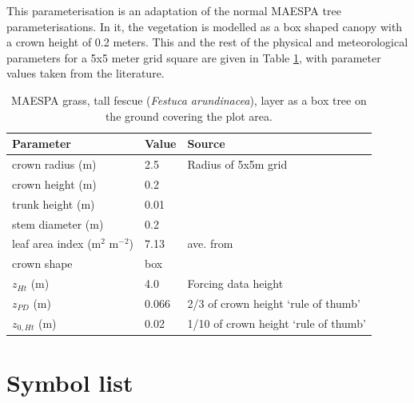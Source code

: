 \documentclass[preprint,12pt,authoryear]{elsarticle}
\begin{document}
This parameterisation is an adaptation of the normal MAESPA tree parameterisations. In it, the vegetation is modelled as a box shaped canopy with a crown height of 0.2 meters. This and the rest of the physical and meteorological parameters for a 5x5 meter grid square are given in Table \ref{tab:grassscaled}, with parameter values taken from the literature.

\begin{center}
\begin{table}[!htbp]
\caption{MAESPA grass, tall fescue (\textit{Festuca arundinacea}), layer as a box tree on the ground covering the plot area. \label{tab:grassscaled}}
\begin{tabular}{ |  l | l | l |}
\hline \textbf{Parameter} & \textbf{Value} & \textbf{Source} \\  \hline
crown radius (m) & 2.5& Radius of 5x5m grid \\ \hline
crown height (m) & 0.2& \cite{Simmons2011} \\ \hline
trunk height (m) & 0.01& \\ \hline
stem diameter (m) & 0.2 &\\ \hline
leaf area index (m$^{2}$ m$^{-2}$)& 7.13 & ave. from \cite{Bijoor2014} \\ \hline
crown shape & box& \\ \hline
$z_{Ht}$ (m)&4.0&Forcing data height \\ \hline
$z_{PD}$ (m) &0.066 & 2/3 of crown height `rule of thumb' \citep{Grimmond1999}\\ \hline
$z_{0,Ht}$ (m) & 0.02 & 1/10 of crown height `rule of thumb' \citep{Grimmond1999}\\ \hline
\end{tabular} 
\end{table}
\end{center}




\section{Symbol list}\label{sec:symbollist}    %




%
\end{document}
